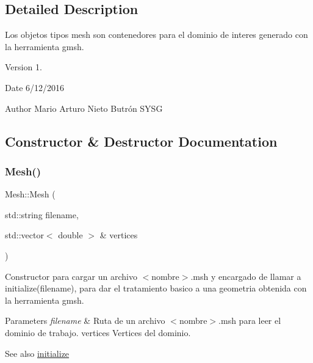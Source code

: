 \subsection{Detailed Description}
Los objetos tipos mesh son contenedores para el dominio de interes generado con la herramienta gmsh. 

\begin{DoxyVersion}{Version}
1. 
\end{DoxyVersion}
\begin{DoxyDate}{Date}
6/12/2016 
\end{DoxyDate}
\begin{DoxyAuthor}{Author}
Mario Arturo Nieto Butrón  S\+Y\+SG 
\end{DoxyAuthor}


\subsection{Constructor \& Destructor Documentation}
\hypertarget{class_mesh_a54a9cf0f6223e63253c8e9f8f99746b3}{}\label{class_mesh_a54a9cf0f6223e63253c8e9f8f99746b3} 
\subsubsection{\texorpdfstring{Mesh()}{Mesh()}}
{\footnotesize\ttfamily Mesh\+::\+Mesh (\begin{DoxyParamCaption}\item[{std\+::string}]{filename,  }\item[{std\+::vector$<$ double $>$ \&}]{vertices }\end{DoxyParamCaption})\hspace{0.3cm}{\ttfamily [inline]}}



Constructor para cargar un archivo $<$nombre$>$.msh y encargado de llamar a initialize(filename), para dar el tratamiento basico a una geometria obtenida con la herramienta gmsh. 


\begin{DoxyParams}{Parameters}
{\em filename} & Ruta de un archivo $<$nombre$>$.msh para leer el dominio de trabajo.  vertices Vertices del dominio. \\
\hline
\end{DoxyParams}
\begin{DoxySeeAlso}{See also}
\hyperlink{class_mesh_afa6559daf1f8495fd0a796fb31370542}{initialize} 
\end{DoxySeeAlso}


